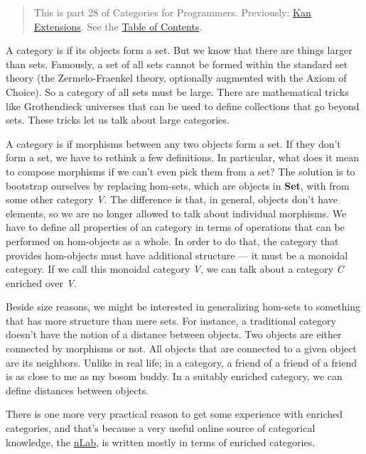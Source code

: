 \begin{quote}
This is part 28 of Categories for Programmers. Previously:
\href{https://bartoszmilewski.com/2017/04/17/kan-extensions/}{Kan
Extensions}. See the
\href{https://bartoszmilewski.com/2014/10/28/category-theory-for-programmers-the-preface/}{Table
of Contents}.
\end{quote}

A category is  if its objects form a set. But we know that
there are things larger than sets. Famously, a set of all sets cannot be
formed within the standard set theory (the Zermelo-Fraenkel theory,
optionally augmented with the Axiom of Choice). So a category of all
sets must be large. There are mathematical tricks like Grothendieck
universes that can be used to define collections that go beyond sets.
These tricks let us talk about large categories.

A category is  if morphisms between any two objects
form a set. If they don't form a set, we have to rethink a few
definitions. In particular, what does it mean to compose morphisms if we
can't even pick them from a set? The solution is to bootstrap ourselves
by replacing hom-sets, which are objects in \textbf{Set}, with
 from some other category \emph{V}. The difference is
that, in general, objects don't have elements, so we are no longer
allowed to talk about individual morphisms. We have to define all
properties of an  category in terms of operations that
can be performed on hom-objects as a whole. In order to do that, the
category that provides hom-objects must have additional structure --- it
must be a monoidal category. If we call this monoidal category \emph{V},
we can talk about a category \emph{C} enriched over \emph{V}.

Beside size reasons, we might be interested in generalizing hom-sets to
something that has more structure than mere sets. For instance, a
traditional category doesn't have the notion of a distance between
objects. Two objects are either connected by morphisms or not. All
objects that are connected to a given object are its neighbors. Unlike
in real life; in a category, a friend of a friend of a friend is as
close to me as my bosom buddy. In a suitably enriched category, we can
define distances between objects.

There is one more very practical reason to get some experience with
enriched categories, and that's because a very useful online source of
categorical knowledge, the \href{https://ncatlab.org/}{nLab}, is written
mostly in terms of enriched categories.


